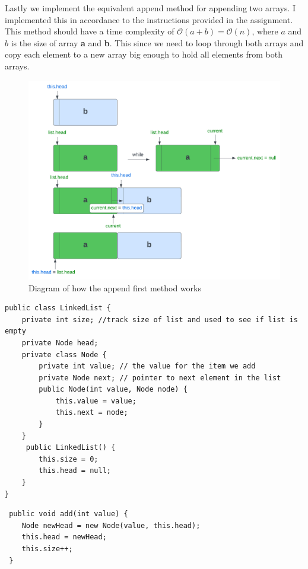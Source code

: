 \documentclass[a4paper,11pt]{article}
\newenvironment{code}{\captionsetup{type=listing}}{}
\begin{document}
Lastly we implement the equivalent append method for appending two arrays. I implemented this in accordance to the instructions provided
in the assignment. This method should have a time complexity of $\mathcal{O}(a+b)=\mathcal{O}(n)$, where $a$ and $b$ is the size of array 
\textbf{a} and \textbf{b}. This since we need to loop through both arrays and copy each element to a new array big enough to hold 
all elements from both arrays.

\begin{figure}[h]
    \centering
    \includegraphics[width=.8\textwidth]{appendDiagram.pdf}
    \caption{Diagram of how the append first method works}
    \label{fig:append}
\end{figure}

\begin{code}
\label{code:classStructure}
\begin{verbatim}
public class LinkedList {
    private int size; //track size of list and used to see if list is empty
    private Node head;
    private class Node {
        private int value; // the value for the item we add
        private Node next; // pointer to next element in the list
        public Node(int value, Node node) {
            this.value = value;
            this.next = node;
        }
    }
     public LinkedList() {
        this.size = 0;
        this.head = null;
    }
}
\end{verbatim}
\end{code}
\newpage
\begin{code}
\label{code:add}
\begin{verbatim}
 public void add(int value) {
    Node newHead = new Node(value, this.head);
    this.head = newHead;
    this.size++;
 }
\end{verbatim}
\end{code}
\end{document}
